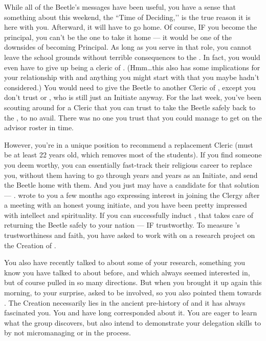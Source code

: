 \documentclass[char]{GL2020}
\begin{document}
While all of the Beetle's messages have been useful, you have a sense that something about this weekend, the ``Time of Deciding,’’ is the true reason it is here with you. Afterward, it will have to go home. Of course, IF you become the principal, you can't be the one to take it home — it would be one of the downsides of becoming Principal. As long as you serve in that role, you cannot leave the school grounds without terrible consequences to the \pSc{}. In fact, you would even have to give up being a cleric of \cTechGod{}. (Hmm\ldots this also has some implications for your relationship with \cJuniorStatesman{} and anything you might start with \cEthics{} that you maybe hadn’t considered.) You would need to give the Beetle to another Cleric of \cTechGod{}, except you don't trust \cAntiChup{} or \cScholarship{}, who is still just an Initiate anyway. For the last week, you've been scouting around for a Cleric that you can trust to take the Beetle safely back to the \pTech{}, to no avail. There was no one you trust that you could manage to get on the advisor roster in time. 

However, you're in a unique position to recommend a replacement Cleric (must be at least 22 years old, which removes most of the students). If you find someone you deem worthy, you can essentially fast-track their religious career to replace you, without them having to go through years and years as an Initiate, and send the Beetle home with them. And you just may have a candidate for that solution — \cHeadScientist{\intro}. \cHeadScientist{} wrote to you a few months ago expressing interest in joining the Clergy after a meeting with an honest young initiate, and you have been pretty impressed with \cHeadScientist{\their} intellect and spirituality. If you can successfully induct \cHeadScientist{}, that takes care of returning the Beetle safely to your nation — IF \cHeadScientist{\theyare} trustworthy. To measure \cHeadScientist{}'s trustworthiness and faith, you have asked  \cHeadScientist{\them} to work with \cEbbPriest{} on a research project on the Creation of \pEarth{}. 

You also have recently talked to \cLibrarian{\intro} about some of your research, something you know you have talked to \cLibrarian{} about before, and which \cLibrarian{\they} always seemed interested in, but of course pulled in so many directions. But when you brought it up again this morning, to your surprise, \cLibrarian{\they} asked to be involved, so you also pointed them towards \cEbbPriest{}. The Creation necessarily lies in the ancient pre-history of \pEarth{} and it has always fascinated you. You and \cEbbPriest{} have long corresponded about it. You are eager to learn what the group discovers, but also intend to demonstrate your delegation skills to \cPrincipal{} by not micromanaging \cHeadScientist{} or \cLibrarian{} in the process.
\end{document}
